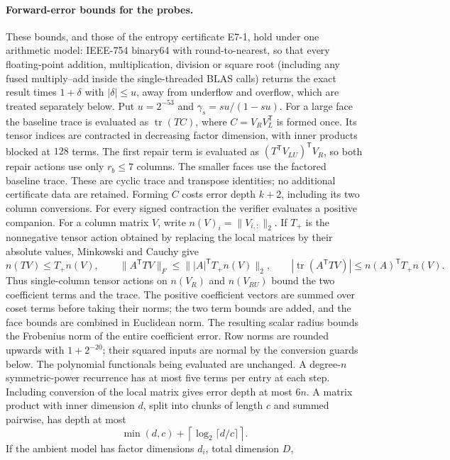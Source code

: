 \paragraph{Forward-error bounds for the probes.}
These bounds, and those of the entropy certificate E7-1, hold under one arithmetic model:
IEEE-754 binary64 with round-to-nearest, so that every floating-point addition, multiplication, division or square root
(including any fused multiply--add inside the single-threaded BLAS calls) returns the exact result times $1+\delta$
with $|\delta|\le u$, away from underflow and overflow, which are treated separately below.
Put $u=2^{-53}$ and $\gamma_s=su/(1-su)$.
For a large face the baseline trace is evaluated as
$\operatorname{tr}(TC)$, where $C=V_RV_L^{\mathsf T}$ is formed once.
Its tensor indices are contracted in decreasing factor dimension, with
inner products blocked at $128$ terms. The first repair term is evaluated
as $(T^{\mathsf T}V_{LU})^{\mathsf T}V_R$, so both repair actions use
only $r_b\le7$ columns. The smaller faces use the factored baseline trace.
These are cyclic trace and transpose identities; no additional
certificate data are retained. Forming $C$ costs error depth $k+2$,
including its two column conversions.
For every signed contraction the verifier evaluates a positive companion.
For a column matrix $V$, write $n(V)_i=\|V_{i,:}\|_2$. If $T_+$ is the
nonnegative tensor action obtained by replacing the local matrices by
their absolute values, Minkowski and Cauchy give
\[
 n(TV)\le T_+n(V),\qquad
 \|A^{\mathsf T}TV\|_F\le\bigl\||A|^{\mathsf T}T_+n(V)\bigr\|_2,
 \qquad
 |\operatorname{tr}(A^{\mathsf T}TV)|\le n(A)^{\mathsf T}T_+n(V).
\]
Thus single-column tensor actions on $n(V_R)$ and $n(V_{RU})$ bound the
two coefficient terms and the trace. The positive coefficient vectors
are summed over coset terms before taking their norms; the two term
bounds are added, and the face bounds are combined in Euclidean norm.
The resulting scalar radius bounds the Frobenius norm of the entire
coefficient error. Row norms are rounded upwards with $1+2^{-20}$;
their squared inputs are normal by the conversion guards below.
The polynomial functionals being evaluated are unchanged.
A degree-$n$ symmetric-power recurrence has at most five terms per entry
at each step. Including conversion of the local matrix gives error depth
at most $6n$. A matrix product with inner dimension $d$, split into
chunks of length $c$ and summed pairwise, has depth at most
\[
 \min(d,c)+\left\lceil\log_2\lceil d/c\rceil\right\rceil.
\]
If the ambient model has factor dimensions $d_i$, total dimension $D$,
